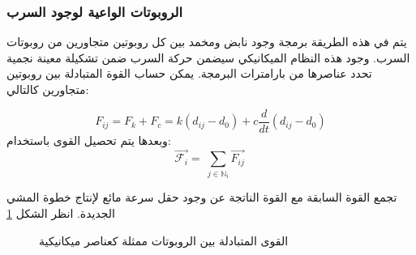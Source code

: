 \subsubsection{الروبوتات الواعية لوجود السرب}


يتم في هذه الطريقة برمجة وجود نابض ومخمد بين كل روبوتين متجاورين من روبوتات السرب. وجود هذه النظام الميكانيكي سيضمن حركة السرب ضمن تشكيلة معينة نجمية تحدد عناصرها من بارامترات البرمجة. يمكن حساب القوة المتبادلة بين روبوتين متجاورين كالتالي:

\begin{equation}
F_{ij}=F_k+F_c=k\left(d_{ij}-d_0\right)+c\frac{d}{dt}\left(d_{ij}-d_0\right)
\end{equation}
وبعدها يتم تحصيل القوى باستخدام:
\begin{equation}
\vec{\mathcal{F}_i}=\ \sum_{j\in\mathbb{N}_i}{\vec{F_{ij}}\ }
\end{equation}


تجمع القوة السابقة مع القوة الناتجة عن وجود حقل سرعة مائع لإنتاج خطوة المشي الجديدة. انظر الشكل \ref{11:fig:6}

\begin{figure}[htbp]
	\centering
	
	\caption{القوى المتبادلة بين الروبوتات ممثلة كعناصر ميكانيكية}
	\label{11:fig:6}
\end{figure}